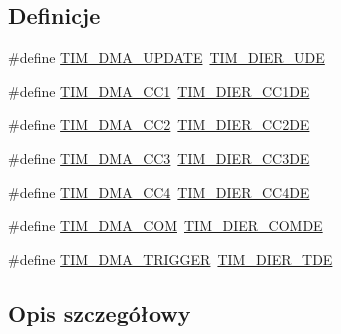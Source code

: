 \subsection*{Definicje}
\begin{DoxyCompactItemize}
\item 
\#define \hyperlink{group___t_i_m___d_m_a__sources_ga45816ad15a4f533027eb202ac0b9aaf5}{T\+I\+M\+\_\+\+D\+M\+A\+\_\+\+U\+P\+D\+A\+TE}~\hyperlink{group___peripheral___registers___bits___definition_gab9f47792b1c2f123464a2955f445c811}{T\+I\+M\+\_\+\+D\+I\+E\+R\+\_\+\+U\+DE}
\item 
\#define \hyperlink{group___t_i_m___d_m_a__sources_ga33b93e8bb82fe8e167b9e9c962c54f83}{T\+I\+M\+\_\+\+D\+M\+A\+\_\+\+C\+C1}~\hyperlink{group___peripheral___registers___bits___definition_gae181bb16ec916aba8ba86f58f745fdfd}{T\+I\+M\+\_\+\+D\+I\+E\+R\+\_\+\+C\+C1\+DE}
\item 
\#define \hyperlink{group___t_i_m___d_m_a__sources_ga792f73196a8e7424655592097d7a3fd5}{T\+I\+M\+\_\+\+D\+M\+A\+\_\+\+C\+C2}~\hyperlink{group___peripheral___registers___bits___definition_ga58f97064991095b28c91028ca3cca28e}{T\+I\+M\+\_\+\+D\+I\+E\+R\+\_\+\+C\+C2\+DE}
\item 
\#define \hyperlink{group___t_i_m___d_m_a__sources_ga3eb2dadbd3109bced45935fb53deeee1}{T\+I\+M\+\_\+\+D\+M\+A\+\_\+\+C\+C3}~\hyperlink{group___peripheral___registers___bits___definition_ga1567bff5dc0564b26a8b3cff1f0fe0a4}{T\+I\+M\+\_\+\+D\+I\+E\+R\+\_\+\+C\+C3\+DE}
\item 
\#define \hyperlink{group___t_i_m___d_m_a__sources_ga59495cf79894dfe5e5b2029863aed956}{T\+I\+M\+\_\+\+D\+M\+A\+\_\+\+C\+C4}~\hyperlink{group___peripheral___registers___bits___definition_gaaba034412c54fa07024e516492748614}{T\+I\+M\+\_\+\+D\+I\+E\+R\+\_\+\+C\+C4\+DE}
\item 
\#define \hyperlink{group___t_i_m___d_m_a__sources_gac5f4c56e944bda8ba0c23b97275020ba}{T\+I\+M\+\_\+\+D\+M\+A\+\_\+\+C\+OM}~\hyperlink{group___peripheral___registers___bits___definition_ga79c3fab9d33de953a0a7f7d6516c73bc}{T\+I\+M\+\_\+\+D\+I\+E\+R\+\_\+\+C\+O\+M\+DE}
\item 
\#define \hyperlink{group___t_i_m___d_m_a__sources_ga21912fd910242e0f63bf9b0953e41c63}{T\+I\+M\+\_\+\+D\+M\+A\+\_\+\+T\+R\+I\+G\+G\+ER}~\hyperlink{group___peripheral___registers___bits___definition_ga5a752d4295f100708df9b8be5a7f439d}{T\+I\+M\+\_\+\+D\+I\+E\+R\+\_\+\+T\+DE}
\end{DoxyCompactItemize}


\subsection{Opis szczegółowy}


